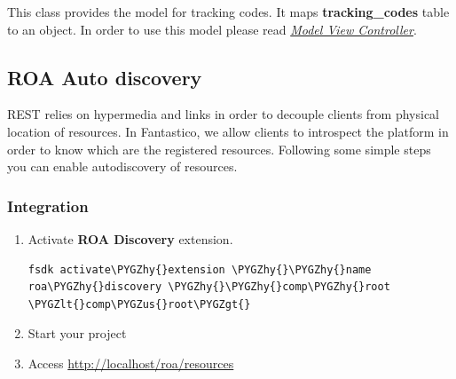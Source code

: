 \documentclass[letterpaper,10pt,english]{sphinxmanual}
\def\PYGZus{\char`\_}
\def\PYGZlt{\char`\<}
\def\PYGZgt{\char`\>}
\def\PYGZhy{\char`\-}
\begin{document}

\begin{fulllineitems}
\label{features/components/tracking_codes/tracking_codes:fantastico.contrib.tracking_codes.models.codes.TrackingCode}
This class provides the model for tracking codes. It maps \textbf{tracking\_codes} table to an object. In order to use this model
please read {\hyperref[features/mvc::doc]{\emph{Model View Controller}}}.

\end{fulllineitems}



\subsection{ROA Auto discovery}
\label{features/components/roa_discovery/roa_discovery::doc}\label{features/components/roa_discovery/roa_discovery:roa-auto-discovery}
REST relies on hypermedia and links in order to decouple clients from physical location of resources. In Fantastico,
we allow clients to introspect the platform in order to know which are the registered resources. Following some simple steps
you can enable autodiscovery of resources.


\subsubsection{Integration}
\label{features/components/roa_discovery/roa_discovery:integration}\begin{enumerate}
\item {} 
Activate \textbf{ROA Discovery} extension.

\begin{Verbatim}[commandchars=\\\{\}]
fsdk activate\PYGZhy{}extension \PYGZhy{}\PYGZhy{}name roa\PYGZhy{}discovery \PYGZhy{}\PYGZhy{}comp\PYGZhy{}root \PYGZlt{}comp\PYGZus{}root\PYGZgt{}
\end{Verbatim}

\item {} 
Start your project

\item {} 
Access \href{http://localhost/roa/resources}{http://localhost/roa/resources}

\end{enumerate}
\end{document}
